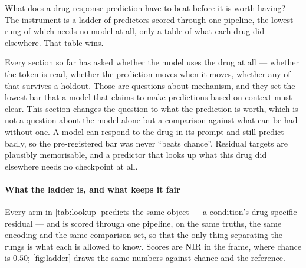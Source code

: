 
\label{sec:methods-baselines}

\begin{question}[7]
What does a drug-response prediction have to beat before it is worth having? The
instrument is a ladder of predictors scored through one pipeline, the lowest rung
of which needs no model at all, only a table of what each drug did elsewhere.
That table wins.
\end{question}

\noindent
Every section so far has asked whether the model uses the drug at all --- whether
the token is read, whether the prediction moves when it moves, whether any of that
survives a holdout. Those are questions about mechanism, and they set the lowest
bar that a model that claims to make predictions based on context must clear. This section changes the question to what the prediction is worth,
which is not a question about the model alone but a comparison against what can be
had without one. A model can respond to the drug in its prompt and still predict
badly, so the pre-registered bar was never ``beats chance''. Residual targets are
plausibly memorisable, and a predictor that looks up what this drug did elsewhere
needs no checkpoint at all. 

\paragraph{What the ladder is, and what keeps it fair} Every arm in
\cref{tab:lookup} predicts the same object --- a condition's drug-specific
residual --- and is scored through one pipeline, on the same truths, the same
encoding and the same comparison set, so that the only thing separating the rungs
is what each is allowed to know. Scores are $\textrm{NIR}$ in the \Rframe{} frame, where
chance is $0.50$; \cref{fig:ladder} draws the same numbers against chance
and the reference.

